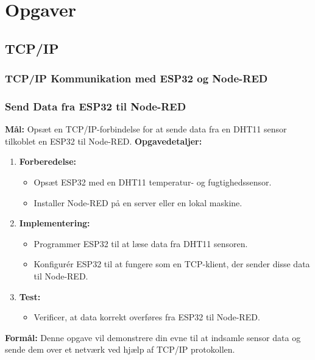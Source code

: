 \documentclass[12pt,a4paper]{book}
\begin{document}
	\chapter{Opgaver}
	\section{TCP/IP}
	\subsection*{TCP/IP Kommunikation med ESP32 og Node-RED}
	\subsection*{Send Data fra ESP32 til Node-RED}
	\textbf{Mål:} Opsæt en TCP/IP-forbindelse for at sende data fra en DHT11 sensor tilkoblet en ESP32 til Node-RED.
	\newline\newline\noindent
	\textbf{Opgavedetaljer:}
	\begin{enumerate}
		\item \textbf{Forberedelse:}
		\begin{itemize}
			\item Opsæt ESP32 med en DHT11 temperatur- og fugtighedssensor.
			\item Installer Node-RED på en server eller en lokal maskine.
		\end{itemize}
		\item \textbf{Implementering:}
		\begin{itemize}
			\item Programmer ESP32 til at læse data fra DHT11 sensoren.
			\item Konfigurér ESP32 til at fungere som en TCP-klient, der sender disse data til Node-RED.
		\end{itemize}
		\item \textbf{Test:}
		\begin{itemize}
			\item Verificer, at data korrekt overføres fra ESP32 til Node-RED.
		\end{itemize}
	\end{enumerate}
	\textbf{Formål:} Denne opgave vil demonstrere din evne til at indsamle sensor data og sende dem over et netværk ved hjælp af TCP/IP protokollen.
	
\end{document}
